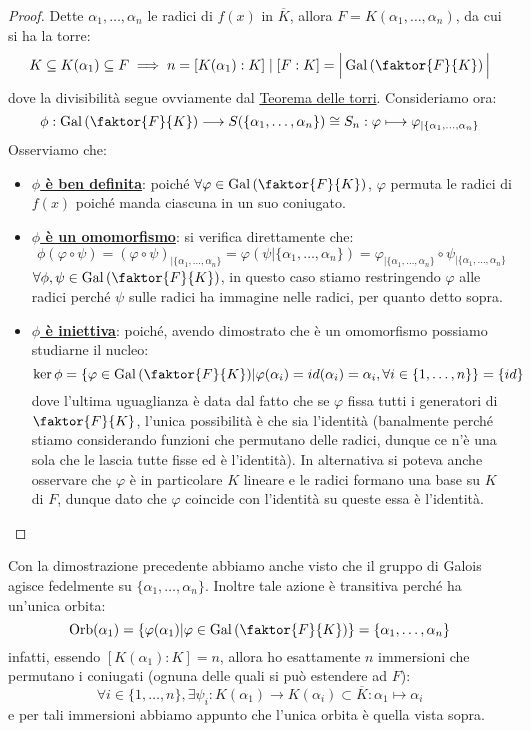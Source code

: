 \documentclass[11pt]{scrartcl}
\begin{document}
\begin{proof}
    Dette $\alpha_1,\ldots,\alpha_n$ le radici di $f(x)$ in $\overline K$, allora $F = K(\alpha_1,\ldots,\alpha_n)$, da cui si ha la torre:
    \[ K \subseteq K(\alpha_1) \subseteq F \implies n = [K(\alpha_1) : K] \mid [F : K] = \Big|\Gal\left(\faktor{F}{K}\right)\Big|
        \]
    dove la divisibilità segue ovviamente dal \hyperref[torri]{Teorema delle torri}. Consideriamo ora:
    \[ \phi: \Gal\left(\faktor{F}{K}\right) \longrightarrow S(\{\alpha_1,\ldots,\alpha_n\}) \cong S_n : \varphi \longmapsto \varphi_{|\{\alpha_1,\ldots,\alpha_n\}}
        \]
    Osserviamo che:
    \begin{itemize}
        \item \underline{\textbf{$\phi$ è ben definita}}: poiché $\forall \varphi \in \Gal\left(\faktor{F}{K}\right)$, $\varphi$ permuta le radici di $f(x)$ poiché manda ciascuna in un suo coniugato.
        \item \underline{\textbf{$\phi$ è un omomorfismo}}: si verifica direttamente che:
        \[ \phi(\varphi \circ \psi) = (\varphi \circ \psi)_{|{\{\alpha_1,\ldots,\alpha_n\}}} = \varphi(\psi{|{\{\alpha_1,\ldots,\alpha_n\}}}) = \varphi_{|{\{\alpha_1,\ldots,\alpha_n\}}} \circ \psi_{|{\{\alpha_1,\ldots,\alpha_n\}}}
            \]
        $\forall \phi,\psi \in \Gal\left(\faktor{F}{K}\right)$, in questo caso stiamo restringendo $\varphi$ alle radici perché $\psi$ sulle radici ha immagine nelle radici, per quanto detto sopra.    
        \item \underline{\textbf{$\phi$ è iniettiva}}: poiché, avendo dimostrato che è un omomorfismo possiamo studiarne il nucleo:
        \[ \ker \phi = \left\{\varphi \in \Gal\left(\faktor{F}{K}\right) \m \varphi(\alpha_i) = id(\alpha_i) = \alpha_i, \forall i \in \{1,\ldots,n\}\right\} = \{id\}
            \]
        dove l'ultima uguaglianza è data dal fatto che se $\varphi$ fissa tutti i generatori di $\faktor{F}{K}$, l'unica possibilità è che sia l'identità (banalmente perché stiamo considerando funzioni che permutano delle radici,
        dunque ce n'è una sola che le lascia tutte fisse ed è l'identità). In alternativa si poteva anche osservare che $\varphi$ è in particolare $K$ lineare e le radici formano una base su $K$ di $F$, dunque dato che $\varphi$ coincide
        con l'identità su queste essa è l'identità.
    \end{itemize}
\end{proof}

\begin{remark}
Con la dimostrazione precedente abbiamo anche visto che il gruppo di Galois agisce fedelmente su $\{\alpha_1,\ldots,\alpha_n\}$. Inoltre tale azione è transitiva perché ha un'unica orbita:
\[ \Orb(\alpha_1) = \left\{\varphi(\alpha_1) \m \varphi \in \Gal\left(\faktor{F}{K}\right)\right\} = \{\alpha_1,\ldots,\alpha_n\}
    \]
infatti, essendo $[K(\alpha_1) : K] = n$, allora ho esattamente $n$ immersioni che permutano i coniugati (ognuna delle quali si può estendere ad $F$):
\[ \forall i \in \{1,\ldots,n\},  \exists \psi_i : K(\alpha_1) \longrightarrow K(\alpha_i) \subset \overline K : \alpha_1 \longmapsto \alpha_i
    \]
e per tali immersioni abbiamo appunto che l'unica orbita è quella vista sopra.
\end{remark}
\end{document}
